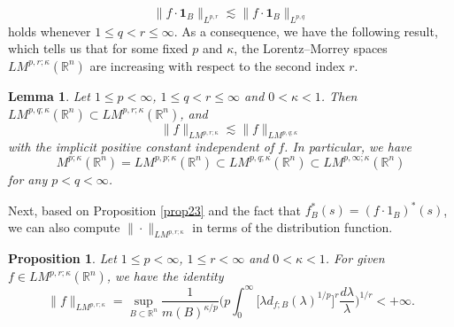 \documentclass{birkjour}
\newtheorem{lem}[thm]{Lemma}
\newtheorem{prop}[thm]{Proposition}
\theoremstyle{definition}
\theoremstyle{remark}
\numberwithin{equation}{section}
\begin{document}
\begin{equation*}
\|f\cdot \mathbf{1}_{B}\|_{L^{p,r}}\lesssim\|f\cdot \mathbf{1}_{B}\|_{L^{p,q}}
\end{equation*}
holds whenever $1\leq q<r\leq\infty$. As a consequence, we have the following result, which tells us that for some fixed $p$ and $\kappa$, the Lorentz--Morrey spaces $LM^{p,r;\kappa}(\mathbb R^n)$ are increasing with respect to the second index $r$.
\begin{lem}
Let $1\leq p<\infty$, $1\leq q<r\leq\infty$ and $0<\kappa<1$. Then $LM^{p,q;\kappa}(\mathbb R^n)\subset LM^{p,r;\kappa}(\mathbb R^n)$, and
\begin{equation*}
\|f\|_{LM^{p,r;\kappa}}\lesssim\|f\|_{LM^{p,q;\kappa}}
\end{equation*}
with the implicit positive constant independent of $f$. In particular, we have
\begin{equation*}
M^{p;\kappa}(\mathbb R^n)=LM^{p,p;\kappa}(\mathbb R^n)\subset LM^{p,q;\kappa}(\mathbb R^n)\subset LM^{p,\infty;\kappa}(\mathbb R^n)
\end{equation*}
for any $p<q<\infty$.
\end{lem}

Next, based on Proposition \ref{prop23} and the fact that $f^{*}_{B}(s)=(f\cdot1_{B})^{*}(s)$, we can also compute $\|\cdot\|_{LM^{p,r;\kappa}}$ in terms of the distribution function.
\begin{prop}\label{prop24}
Let $1\leq p<\infty$, $1\leq r<\infty$ and $0<\kappa<1$. For given $f\in LM^{p,r;\kappa}(\mathbb R^n)$, we have the identity
\begin{equation*}
\|f\|_{LM^{p,r;\kappa}}=\sup_{B\subset\mathbb R^n}\frac{1}{m(B)^{\kappa/p}}
\bigg(p\int_0^{\infty}\Big[\lambda d_{f;B}(\lambda)^{1/p}\Big]^r\frac{d\lambda}{\lambda}\bigg)^{1/r}<+\infty.
\end{equation*}
\end{prop}
\end{document}
